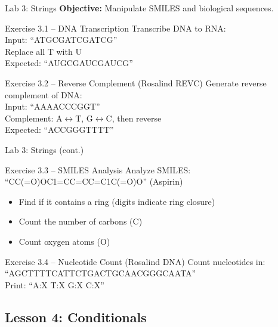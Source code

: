 \documentclass{beamer}
\begin{document}
\begin{frame}{\textcolor{labcolor}{Lab 3: Strings}}
    \small
    \textbf{Objective:} Manipulate SMILES and biological sequences.
    \vspace{0.5em}
    \begin{block}{Exercise 3.1 -- DNA Transcription}
        Transcribe DNA to RNA:\\
        Input: ``ATGCGATCGATCG''\\
        Replace all T with U\\
        Expected: ``AUGCGAUCGAUCG''
    \end{block}
    \vspace{0.5em}
    \begin{block}{Exercise 3.2 -- Reverse Complement (Rosalind REVC)}
        Generate reverse complement of DNA:\\
        Input: ``AAAACCCGGT''\\
        Complement: A$\leftrightarrow$T, G$\leftrightarrow$C, then reverse\\
        Expected: ``ACCGGGTTTT''
    \end{block}
\end{frame}

\begin{frame}{\textcolor{labcolor}{Lab 3: Strings (cont.)}}
    \small
    \begin{block}{Exercise 3.3 -- SMILES Analysis}
        Analyze SMILES: ``CC(=O)OC1=CC=CC=C1C(=O)O'' (Aspirin)
        \begin{itemize}
            \item Find if it contains a ring (digits indicate ring closure)
            \item Count the number of carbons (C)
            \item Count oxygen atoms (O)
        \end{itemize}
    \end{block}
    \vspace{0.5em}
    \begin{block}{Exercise 3.4 -- Nucleotide Count (Rosalind DNA)}
        Count nucleotides in: ``AGCTTTTCATTCTGACTGCAACGGGCAATA''\\
        Print: ``A:X T:X G:X C:X''
    \end{block}
\end{frame}

\subsection{Lesson 4: Conditionals}
\end{document}
